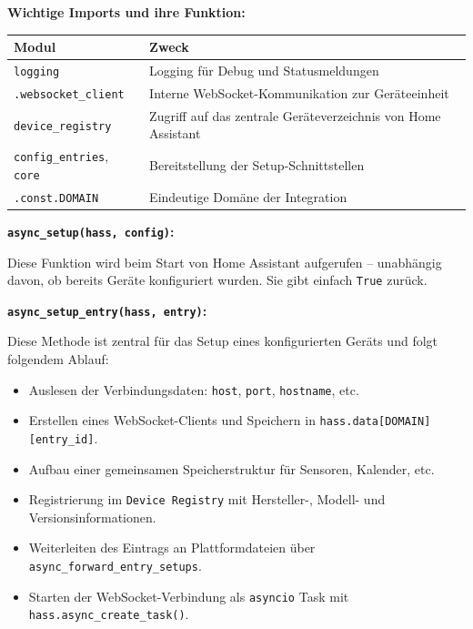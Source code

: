 \textbf{Wichtige Imports und ihre Funktion:}

\begin{tabular}{|p{5cm}|p{9cm}|}
\hline
\textbf{Modul} & \textbf{Zweck} \\
\hline
\texttt{logging} & Logging für Debug und Statusmeldungen \\
\texttt{.websocket\_client} & Interne WebSocket-Kommunikation zur Geräteeinheit \\
\texttt{device\_registry} & Zugriff auf das zentrale Geräteverzeichnis von Home Assistant \\
\texttt{config\_entries}, \texttt{core} & Bereitstellung der Setup-Schnittstellen \\
\texttt{.const.DOMAIN} & Eindeutige Domäne der Integration \\
\hline
\end{tabular}

\vspace{0.5cm}

\textbf{\texttt{async\_setup(hass, config)}:}

Diese Funktion wird beim Start von Home Assistant aufgerufen – unabhängig davon, ob bereits Geräte konfiguriert wurden. Sie gibt einfach \texttt{True} zurück.

\vspace{0.5cm}

\textbf{\texttt{async\_setup\_entry(hass, entry)}:}

Diese Methode ist zentral für das Setup eines konfigurierten Geräts und folgt folgendem Ablauf:

\begin{itemize}
  \item Auslesen der Verbindungsdaten: \texttt{host}, \texttt{port}, \texttt{hostname}, etc.\\
  \item Erstellen eines WebSocket-Clients und Speichern in \texttt{hass.data[DOMAIN][entry\_id]}.\\
  \item Aufbau einer gemeinsamen Speicherstruktur für Sensoren, Kalender, etc.\\
  \item Registrierung im \texttt{Device Registry} mit Hersteller-, Modell- und Versionsinformationen.\\
  \item Weiterleiten des Eintrags an Plattformdateien über \texttt{async\_forward\_entry\_setups}.\\
  \item Starten der WebSocket-Verbindung als \texttt{asyncio} Task mit \texttt{hass.async\_create\_task()}.
\end{itemize}

